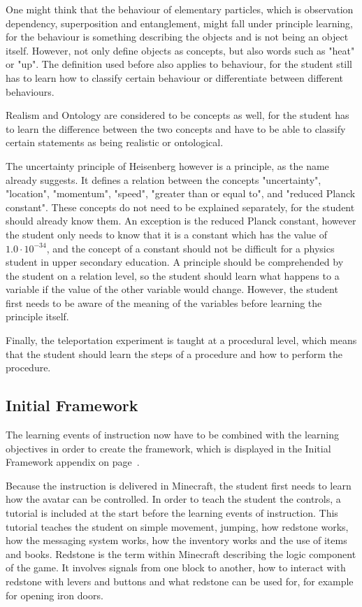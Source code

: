 \documentclass[11pt,twoside]{report} %
\begin{document}
One might think that the behaviour of elementary particles, which is observation dependency, superposition and entanglement, might fall under principle learning, for the behaviour is something describing the objects and is not being an object itself. However,  not only define objects as concepts, but also words such as "heat" or "up". The definition used before also applies to behaviour, for the student still has to learn how to classify certain behaviour or differentiate between different behaviours.

Realism and Ontology are considered to be concepts as well, for the student has to learn the difference between the two concepts and have to be able to classify certain statements as being realistic or ontological.

The uncertainty principle of Heisenberg however is a principle, as the name already suggests. It defines a relation between the concepts "uncertainty", "location", "momentum", "speed", "greater than or equal to", and "reduced Planck constant". These concepts do not need to be explained separately, for the student should already know them. An exception is the reduced Planck constant, however the student only needs to know that it is a constant which has the value of $1.0 \cdot 10^{-34}$, and the concept of a constant should not be difficult for a physics student in upper secondary education. A principle should be comprehended by the student on a relation level, so the student should learn what happens to a variable if the value of the other variable would change. However, the student first needs to be aware of the meaning of the variables before learning the principle itself.

Finally, the teleportation experiment is taught at a procedural level, which means that the student should learn the steps of a procedure and how to perform the procedure.

\subsection{Initial Framework}

The learning events of instruction now have to be combined with the learning objectives in order to create the framework, which is displayed in the Initial Framework appendix on page~\pageref{app:framework1}.

Because the instruction is delivered in Minecraft, the student first needs to learn how the avatar can be controlled. In order to teach the student the controls, a tutorial is included at the start before the learning events of instruction. This tutorial teaches the student on simple movement, jumping, how redstone works, how the messaging system works, how the inventory works and the use of items and books. Redstone is the term within Minecraft describing the logic component of the game. It involves signals from one block to another, how to interact with redstone with levers and buttons and what redstone can be used for, for example for opening iron doors.
\end{document}
